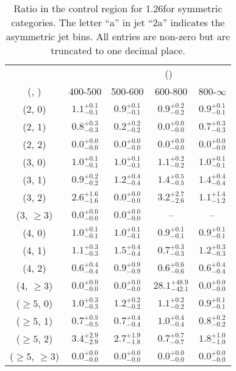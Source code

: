 \begin{table}[h!]
\tiny
\centering
\caption{Ratio in the \gj control region for 1.26\ifb for symmetric categories. The letter ``a'' in jet \eg ``2a''  indicates the asymmetric jet bins. All entries are non-zero but are truncated to one decimal place.\label{tab:ratiosep_gj_ewk_sym}}
\begin{tabular}
{ccccc}
	\hline\hline
&	& \multicolumn{4}{c}{\scalht (\gev)} \\ 
	 (\njet,  \nb) & 400-500 & 500-600 & 600-800 & 800-$\infty$ \\ [0.8ex] 
\hline
	(2, 0) & $1.1^{+ 0.1 }_{- 0.1 }$ & $0.9^{+ 0.1 }_{- 0.1 }$ & $0.9^{+ 0.2 }_{- 0.2 }$ & $0.9^{+ 0.1 }_{- 0.1 }$ \\[0.5ex] 
	(2, 1) & $0.8^{+ 0.3 }_{- 0.3 }$ & $0.2^{+ 0.2 }_{- 0.2 }$ & $0.0^{+ 0.0 }_{- 0.0 }$ & $0.7^{+ 0.3 }_{- 0.3 }$ \\[0.5ex] 
	(2, 2) & $0.0^{+ 0.0 }_{- 0.0 }$ & $0.0^{+ 0.0 }_{- 0.0 }$ & $0.0^{+ 0.0 }_{- 0.0 }$ & $0.0^{+ 0.0 }_{- 0.0 }$ \\[0.5ex] 
	(3, 0) & $1.0^{+ 0.1 }_{- 0.1 }$ & $1.0^{+ 0.1 }_{- 0.1 }$ & $1.1^{+ 0.2 }_{- 0.2 }$ & $1.0^{+ 0.1 }_{- 0.1 }$ \\[0.5ex] 
	(3, 1) & $0.9^{+ 0.2 }_{- 0.2 }$ & $1.2^{+ 0.4 }_{- 0.4 }$ & $1.4^{+ 0.5 }_{- 0.5 }$ & $1.4^{+ 0.4 }_{- 0.4 }$ \\[0.5ex] 
	(3, 2) & $2.6^{+ 1.6 }_{- 1.6 }$ & $0.0^{+ 0.0 }_{- 0.0 }$ & $3.2^{+ 2.7 }_{- 2.6 }$ & $1.1^{+ 1.4 }_{- 1.2 }$ \\[0.5ex] 
	(3, $\ge3$) & $0.0^{+ 0.0 }_{- 0.0 }$ & $0.0^{+ 0.0 }_{- 0.0 }$ & -- & -- \\[0.5ex] 
	(4, 0) & $1.0^{+ 0.1 }_{- 0.1 }$ & $1.0^{+ 0.1 }_{- 0.1 }$ & $0.9^{+ 0.1 }_{- 0.1 }$ & $0.9^{+ 0.1 }_{- 0.1 }$ \\[0.5ex] 
	(4, 1) & $1.1^{+ 0.3 }_{- 0.3 }$ & $1.5^{+ 0.4 }_{- 0.4 }$ & $0.7^{+ 0.3 }_{- 0.3 }$ & $1.2^{+ 0.3 }_{- 0.3 }$ \\[0.5ex] 
	(4, 2) & $0.6^{+ 0.4 }_{- 0.4 }$ & $0.9^{+ 0.9 }_{- 0.9 }$ & $0.6^{+ 0.6 }_{- 0.6 }$ & $0.6^{+ 0.4 }_{- 0.4 }$ \\[0.5ex] 
	(4, $\ge3$) & $0.0^{+ 0.0 }_{- 0.0 }$ & $0.0^{+ 0.0 }_{- 0.0 }$ & $28.1^{+ 48.9 }_{- 42.1 }$ & $0.0^{+ 0.0 }_{- 0.0 }$ \\[0.5ex] 
	($\ge5$, 0) & $1.0^{+ 0.3 }_{- 0.3 }$ & $1.2^{+ 0.2 }_{- 0.2 }$ & $1.1^{+ 0.2 }_{- 0.2 }$ & $0.9^{+ 0.1 }_{- 0.1 }$ \\[0.5ex] 
	($\ge5$, 1) & $0.7^{+ 0.5 }_{- 0.5 }$ & $0.7^{+ 0.4 }_{- 0.4 }$ & $1.0^{+ 0.4 }_{- 0.4 }$ & $0.8^{+ 0.2 }_{- 0.2 }$ \\[0.5ex] 
	($\ge5$, 2) & $3.4^{+ 2.9 }_{- 2.9 }$ & $2.7^{+ 1.9 }_{- 1.8 }$ & $0.7^{+ 0.7 }_{- 0.7 }$ & $1.8^{+ 1.0 }_{- 1.0 }$ \\[0.5ex] 
	($\ge5$, $\ge3$) & $0.0^{+ 0.0 }_{- 0.0 }$ & $0.0^{+ 0.0 }_{- 0.0 }$ & $0.0^{+ 0.0 }_{- 0.0 }$ & $0.0^{+ 0.0 }_{- 0.0 }$ \\[0.5ex] 
	\hline
	\hline
\end{tabular}
\end{table}
